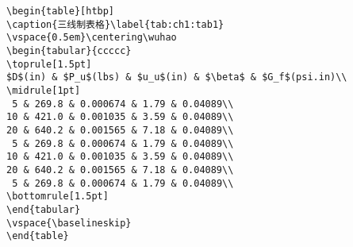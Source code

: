 \begin{verbatim}
\begin{table}[htbp]
\caption{三线制表格}\label{tab:ch1:tab1}
\vspace{0.5em}\centering\wuhao
\begin{tabular}{ccccc}
\toprule[1.5pt]
$D$(in) & $P_u$(lbs) & $u_u$(in) & $\beta$ & $G_f$(psi.in)\\
\midrule[1pt]
 5 & 269.8 & 0.000674 & 1.79 & 0.04089\\
10 & 421.0 & 0.001035 & 3.59 & 0.04089\\
20 & 640.2 & 0.001565 & 7.18 & 0.04089\\
 5 & 269.8 & 0.000674 & 1.79 & 0.04089\\
10 & 421.0 & 0.001035 & 3.59 & 0.04089\\
20 & 640.2 & 0.001565 & 7.18 & 0.04089\\
 5 & 269.8 & 0.000674 & 1.79 & 0.04089\\
\bottomrule[1.5pt]
\end{tabular}
\vspace{\baselineskip}
\end{table}
\end{verbatim}


